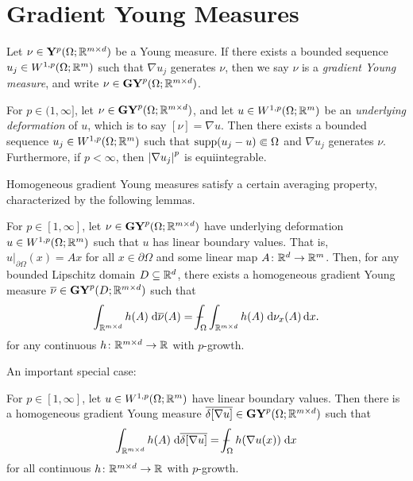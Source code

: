 \section{Gradient Young Measures}
Let $\nu \in \mathbf{Y}^p(\Omega;\mathbb{R}^{m \times d})$ be a Young measure. If there exists a bounded sequence $u_j \in W^{1,p}(\Omega;\mathbb{R}^m)$ such that $\nabla u_j$ generates $\nu$, then we say $\nu$ is a \textit{gradient Young measure}, and write $\nu \in \mathbf{GY}^p(\Omega;\mathbb{R}^{m \times d})$.
\begin{lemma} \label{lem:gradientYM}
    For $p \in (1,\infty]$, let $\nu \in \mathbf{GY}^p(\Omega;\mathbb{R}^{m \times d})$, and let $u \in W^{1,p}(\Omega;\mathbb{R}^m)$ be an \textit{underlying deformation} of $u$, which is to say $[\nu] = \nabla u$. Then there exists a bounded sequence $u_j \in W^{1,p}(\Omega;\mathbb{R}^m)$ such that $\operatorname{supp}(u_j - u) \Subset \Omega$ and $\nabla u_j$ generates $\nu$. Furthermore, if $p < \infty$, then $\left\lvert {\nabla u_j} \right\rvert^p$ is equiintegrable.
\end{lemma}

Homogeneous gradient Young measures satisfy a certain averaging property, characterized by the following lemmas.
\begin{lemma}
    For $p \in [1,\infty]$, let $\nu \in \mathbf{GY}^p(\Omega;\mathbb{R}^{m \times d})$ have underlying deformation $u \in W^{1,p}(\Omega;\mathbb{R}^m)$ such that $u$ has linear boundary values. That is, $u \vert_{\partial\Omega}(x) = Ax$ for all $x \in \partial\Omega$ and some linear map $A \colon \mathbb{R}^d \to \mathbb{R}^m$. Then, for any bounded Lipschitz domain $D \subseteq \mathbb{R}^d$, there exists a homogeneous gradient Young measure $\overline{\nu} \in \mathbf{GY}^p(D;\mathbb{R}^{m \times d})$ such that 
    \begin{equation}
        \int_{\bbR^{m \times d}} h(A) \; \d\overline{\nu}(A) = \dashint_\Omega \int_{\bbR^{m \times d}} h(A) \; \d\nu_x(A) \, \d x.
    \end{equation}
    for any continuous $h \colon \mathbb{R}^{m \times d} \to \mathbb{R}$ with $p$-growth.
\end{lemma}
An important special case:
\begin{lemma}
    For $p \in [1,\infty]$, let $u \in W^{1,p}(\Omega;\mathbb{R}^m)$ have linear boundary values. Then there is a homogeneous gradient Young measure $\overline{\delta[\nabla u]} \in \mathbf{GY}^p(\Omega;\mathbb{R}^{m \times d})$ such that 
    \begin{equation}
        \int_{\bbR^{m \times d}} h(A) \; \d\overline{\delta[\nabla u]} = \dashint_\Omega h(\nabla u(x)) \; \d x
    \end{equation}
    for all continuous $h \colon \mathbb{R}^{m \times d} \to \mathbb{R}$ with $p$-growth.
\end{lemma}